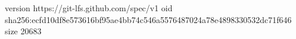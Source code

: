 version https://git-lfs.github.com/spec/v1
oid sha256:ecfd10df8e573616bf95ae4bb74c546a5576487024a78e4898330532dc71f646
size 20683
